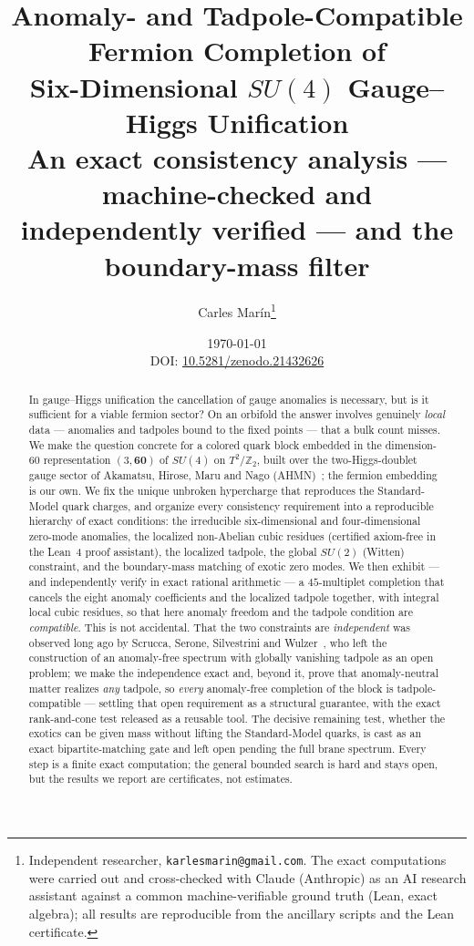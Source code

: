 \documentclass[11pt,a4paper]{article}
\title{\textbf{Anomaly- and Tadpole-Compatible Fermion Completion of\\
Six-Dimensional $SU(4)$ Gauge--Higgs Unification}\\[4pt]
\large\textnormal{An exact consistency analysis --- machine-checked and independently verified --- and the boundary-mass filter}}
\author{Carles Mar\'in\thanks{Independent researcher, \texttt{karlesmarin@gmail.com}.
The exact computations were carried out and cross-checked with Claude (Anthropic) as
an AI research assistant against a common machine-verifiable ground truth (Lean,
exact algebra); all results are reproducible from the ancillary
scripts and the Lean certificate.}}
\date{\today\\[2pt]\small DOI: \href{https://doi.org/10.5281/zenodo.21432626}{10.5281/zenodo.21432626}}
\begin{document}
\maketitle

\begin{abstract}
\noindent
In gauge--Higgs unification the cancellation of gauge anomalies is necessary, but is
it sufficient for a viable fermion sector? On an orbifold the answer involves genuinely
\emph{local} data --- anomalies and tadpoles bound to the fixed points --- that a bulk
count misses. We make the question concrete for a colored quark block embedded in the
dimension-$60$ representation $(3,\mathbf{60})$ of $SU(4)$ on $T^2/\mathbb{Z}_2$, built
over the two-Higgs-doublet gauge sector of Akamatsu, Hirose, Maru and Nago
(AHMN)~\cite{AHMN}; the fermion embedding is our own. We fix the unique unbroken
hypercharge that reproduces the Standard-Model quark charges, and organize every
consistency requirement into a reproducible hierarchy of exact conditions: the
irreducible six-dimensional and four-dimensional zero-mode anomalies, the localized
non-Abelian cubic residues (certified axiom-free in the Lean~4 proof assistant), the
localized tadpole, the global $SU(2)$ (Witten) constraint, and the boundary-mass
matching of exotic zero modes. We then exhibit --- and independently verify in exact
rational arithmetic --- a $45$-multiplet completion that cancels the eight anomaly
coefficients and the localized tadpole together, with integral local cubic residues,
so that here anomaly freedom and the tadpole condition are \emph{compatible}. This is not
accidental. That the two constraints are \emph{independent} was observed long ago by
Scrucca, Serone, Silvestrini and Wulzer~\cite{SSSW}, who left the construction of an
anomaly-free spectrum with globally vanishing tadpole as an open problem; we make the
independence exact and, beyond it, prove that anomaly-neutral matter realizes \emph{any}
tadpole, so \emph{every} anomaly-free completion of the block is tadpole-compatible ---
settling that open requirement as a structural guarantee, with the exact rank-and-cone
test released as a reusable tool. The
decisive remaining test, whether the exotics can be given mass without lifting the
Standard-Model quarks, is cast as an exact bipartite-matching gate and left open
pending the full brane spectrum. Every step is a finite exact computation; the general
bounded search is hard and stays open, but the results we report are certificates, not
estimates.
\end{abstract}
\end{document}

